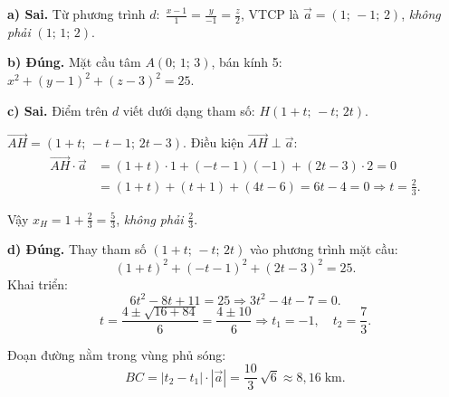 \begin{loigiai}
\textbf{a) Sai.} Từ phương trình $d:\; \frac{x-1}{1} = \frac{y}{-1} = \frac{z}{2}$, VTCP là $\vec{a} = (1;\,-1;\,2)$, \textit{không phải} $(1;\,1;\,2)$.

\textbf{b) Đúng.} Mặt cầu tâm $A(0;\,1;\,3)$, bán kính 5: $x^2 + (y-1)^2 + (z-3)^2 = 25$.

\textbf{c) Sai.} Điểm trên $d$ viết dưới dạng tham số: $H(1+t;\,-t;\,2t)$.

$\overrightarrow{AH} = (1+t;\,-t-1;\,2t-3)$. Điều kiện $\overrightarrow{AH} \perp \vec{a}$:
\begin{align*}
\overrightarrow{AH} \cdot \vec{a} &= (1+t) \cdot 1 + (-t-1)(-1) + (2t-3) \cdot 2 = 0 \\
&= (1+t) + (t+1) + (4t-6) = 6t - 4 = 0 \Rightarrow t = \frac{2}{3}.
\end{align*}

Vậy $x_H = 1 + \frac{2}{3} = \frac{5}{3}$, \textit{không phải} $\frac{2}{3}$.

\textbf{d) Đúng.} Thay tham số $(1+t;\,-t;\,2t)$ vào phương trình mặt cầu:
\[ (1+t)^2 + (-t-1)^2 + (2t-3)^2 = 25. \]
Khai triển:
\[ 6t^2 - 8t + 11 = 25 \Rightarrow 3t^2 - 4t - 7 = 0. \]
\[ t = \frac{4 \pm \sqrt{16 + 84}}{6} = \frac{4 \pm 10}{6} \Rightarrow t_1 = -1, \quad t_2 = \frac{7}{3}. \]

Đoạn đường nằm trong vùng phủ sóng:
\[ BC = |t_2 - t_1| \cdot |\vec{a}| = \frac{10}{3}\,\sqrt{6} \approx \boxed{8{,}16\;\text{km}}. \]
\end{loigiai}
